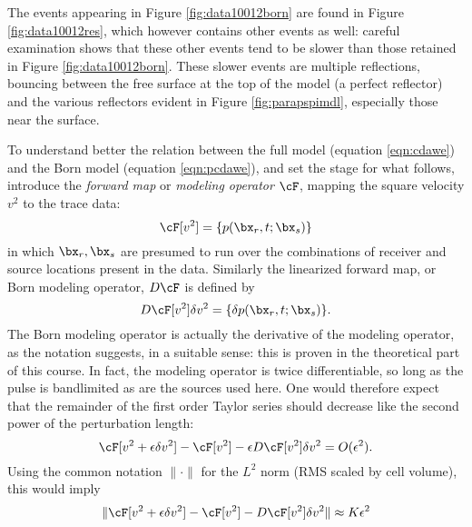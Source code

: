
The events appearing in Figure \ref{fig:data10012born} are found in Figure \ref{fig:data10012res}, which however contains other events as well: careful examination shows that these other events tend to be slower than those retained in Figure \ref{fig:data10012born}. These slower events are multiple reflections, bouncing between the free surface at the top of the model (a perfect reflector) and the various reflectors evident in Figure \ref{fig:parapspimdl}, especially those near the surface.

To understand better the relation between the full model (equation \ref{eqn:cdawe}) and the Born model (equation \ref{eqn:pcdawe}), and set the stage for what follows, introduce the {\em forward map} or {\em modeling operator} $\cF$, mapping the square velocity $v^2$ to the trace data:
\begin{equation}
\label{eqn:mdlop}
\cF[v^2] = \{p(\bx_r,t;\bx_s)\}
\end{equation}
in which $\bx_r,\bx_s$ are presumed to run over the combinations of receiver and source locations present in the data. Similarly the linearized forward map, or Born modeling operator, $D\cF$ is defined by
\begin{equation}
\label{eqn:pmdlop}
D\cF[v^2]\delta v^2 = \{\delta p(\bx_r,t;\bx_s)\}.
\end{equation}
The Born modeling operator is actually the derivative of the modeling operator, as the notation suggests, in a suitable sense: this is proven in the theoretical part of this course. In fact, the modeling operator is twice differentiable, so long as the pulse is bandlimited as are the sources used here. One would therefore expect that the remainder of the first order Taylor series should decrease like the second power of the perturbation length:
\begin{equation}
\label{eqn:taylor1}
\cF[v^2 + \epsilon \delta v^2] - \cF[v^2] - \epsilon D\cF[v^2]\delta v^2 = O(\epsilon^2).
\end{equation}
Using the common notation $\|\cdot\|$ for the $L^2$ norm (RMS scaled by cell volume), this would imply
\begin{equation}
\label{eqn:taylor1l2}
\|\cF[v^2 + \epsilon \delta v^2] - \cF[v^2] - D\cF[v^2]\delta v^2 \| \approx K \epsilon^2
\end{equation}

